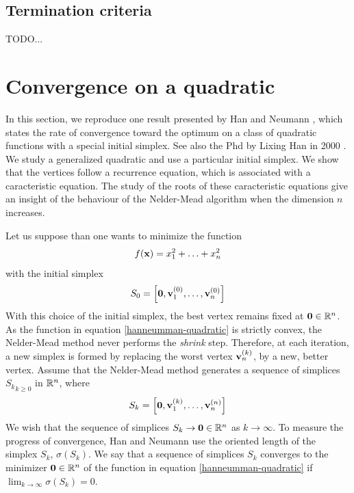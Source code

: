 \subsection{Termination criteria}

TODO...

\section{Convergence on a quadratic}

In this section, we reproduce one result 
presented by Han and Neumann \cite{HanNeumann2006}, which states 
the rate of convergence toward the optimum on a class of quadratic functions with a special initial 
simplex.
See also the Phd by Lixing Han in 2000 \cite{Han2000}.
We study a generalized quadratic and use a particular 
initial simplex. We show that the vertices follow 
a recurrence equation, which is associated with a caracteristic 
equation. The study of the roots of these caracteristic equations 
give an insight of the behaviour of the Nelder-Mead algorithm
when the dimension $n$ increases.

Let us suppose than one wants to minimize the function 
\begin{eqnarray}
\label{hanneumman-quadratic}
f(\mathbf{x}) = x_1^2+\ldots+x_n^2
\end{eqnarray}
with the initial simplex 
\begin{eqnarray}
S_0 = \left[\bold{0},\mathbf{v}^{(0)}_1,\ldots,\mathbf{v}^{(0)}_n\right]
\end{eqnarray}
With this choice of the initial simplex, the best vertex remains fixed 
at $\bold{0}\in\mathbb{R}^n$. As the function in equation \ref{hanneumman-quadratic}
is strictly convex, the Nelder-Mead method never performs
the \emph{shrink} step. Therefore, at each iteration, a new simplex 
is formed by replacing the worst vertex $\mathbf{v}^{(k)}_n$, by a 
new, better vertex. Assume that the Nelder-Mead method 
generates a sequence of simplices ${S_k}_{k\geq 0}$ in $\mathbb{R}^n$,
where 
\begin{eqnarray}
S_k = \left[\bold{0},\mathbf{v}^{(k)}_1,\ldots,\mathbf{v}^{(n)}_n\right]
\end{eqnarray}
We wish that the sequence of simplices ${S_k}\rightarrow \bold{0}\in\mathbb{R}^n$
as $k\rightarrow \infty$. To measure the progress of convergence,
Han and Neumann use the oriented length of the simplex $S_k$, $\sigma(S_k)$.
We say that a sequence of simplices ${S_k}$ converges to the minimizer $\bold{0}\in\mathbb{R}^n$
of the function in equation \ref{hanneumman-quadratic} if 
$\lim_{k\rightarrow \infty} \sigma(S_k) = 0$.


